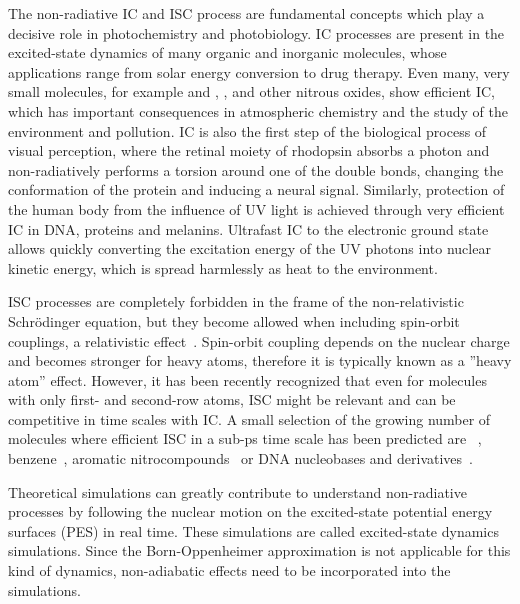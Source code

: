 \documentclass[a4paper,11pt,DIV=15,openany,twoside=false]{scrbook}
\begin{document}
The non-radiative IC and ISC process are fundamental concepts which play a decisive role in photochemistry and photobiology. IC processes are present in the excited-state dynamics of many organic and inorganic molecules, whose applications range from solar energy conversion to drug therapy. Even many, very small molecules, for example  and , ,  and other nitrous oxides, show efficient IC, which has important consequences in atmospheric chemistry and the study of the environment and pollution. IC is also the first step of the biological process of visual perception, where the retinal moiety of rhodopsin absorbs a photon and non-radiatively performs a torsion around one of the double bonds, changing the conformation of the protein and inducing a neural signal. Similarly, protection of the human body from the influence of UV light is achieved through very efficient IC in DNA, proteins and melanins. Ultrafast IC to the electronic ground state allows quickly converting the excitation energy of the UV photons into nuclear kinetic energy, which is spread harmlessly as heat to the environment.

ISC processes are completely forbidden in the frame of the non-relativistic Schr\"odinger equation, but they become allowed when including spin-orbit couplings, a relativistic effect~\cite{Marian2012WCMS}. Spin-orbit coupling depends on the nuclear charge and becomes stronger for heavy atoms, therefore it is typically known as a ''heavy atom'' effect. However, it has been recently recognized that even for molecules with only first- and second-row atoms, ISC might be relevant and can be competitive in time scales with IC. A small selection of the growing number of molecules where efficient ISC in a sub-ps time scale has been predicted are ~\cite{Wilkinson2014JCP,Mai2014JCP_SO2,Leveque2014JCP_ISC}, benzene~\cite{Penfold2012JCP}, aromatic nitrocompounds~\cite{Vogt2013JPC} or DNA nucleobases and derivatives~\cite{Crespo-Hernandez2004CR, Richter2012JPCL, Martinez-Fernandez2012CC, Mai2013C, Reichardt2010CC}.

Theoretical simulations can greatly contribute to understand non-radiative processes by following the nuclear motion on the excited-state potential energy surfaces (PES) in real time. These simulations are called excited-state dynamics simulations. 
Since the Born-Oppenheimer approximation is not applicable for this kind of dynamics, non-adiabatic effects need to be incorporated into the simulations.
\end{document}
